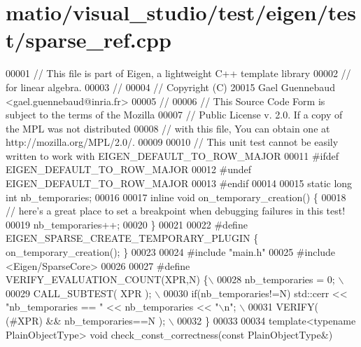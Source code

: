 \hypertarget{matio_2visual__studio_2test_2eigen_2test_2sparse__ref_8cpp_source}{}\section{matio/visual\+\_\+studio/test/eigen/test/sparse\+\_\+ref.cpp}
\label{matio_2visual__studio_2test_2eigen_2test_2sparse__ref_8cpp_source}

\begin{DoxyCode}
00001 \textcolor{comment}{// This file is part of Eigen, a lightweight C++ template library}
00002 \textcolor{comment}{// for linear algebra.}
00003 \textcolor{comment}{//}
00004 \textcolor{comment}{// Copyright (C) 20015 Gael Guennebaud <gael.guennebaud@inria.fr>}
00005 \textcolor{comment}{//}
00006 \textcolor{comment}{// This Source Code Form is subject to the terms of the Mozilla}
00007 \textcolor{comment}{// Public License v. 2.0. If a copy of the MPL was not distributed}
00008 \textcolor{comment}{// with this file, You can obtain one at http://mozilla.org/MPL/2.0/.}
00009 
00010 \textcolor{comment}{// This unit test cannot be easily written to work with EIGEN\_DEFAULT\_TO\_ROW\_MAJOR}
00011 \textcolor{preprocessor}{#ifdef EIGEN\_DEFAULT\_TO\_ROW\_MAJOR}
00012 \textcolor{preprocessor}{#undef EIGEN\_DEFAULT\_TO\_ROW\_MAJOR}
00013 \textcolor{preprocessor}{#endif}
00014 
00015 \textcolor{keyword}{static} \textcolor{keywordtype}{long} \textcolor{keywordtype}{int} nb\_temporaries;
00016 
00017 \textcolor{keyword}{inline} \textcolor{keywordtype}{void} on\_temporary\_creation() \{
00018   \textcolor{comment}{// here's a great place to set a breakpoint when debugging failures in this test!}
00019   nb\_temporaries++;
00020 \}
00021 
00022 \textcolor{preprocessor}{#define EIGEN\_SPARSE\_CREATE\_TEMPORARY\_PLUGIN \{ on\_temporary\_creation(); \}}
00023 
00024 \textcolor{preprocessor}{#include "main.h"}
00025 \textcolor{preprocessor}{#include <Eigen/SparseCore>}
00026 
00027 \textcolor{preprocessor}{#define VERIFY\_EVALUATION\_COUNT(XPR,N) \{\(\backslash\)}
00028 \textcolor{preprocessor}{    nb\_temporaries = 0; \(\backslash\)}
00029 \textcolor{preprocessor}{    CALL\_SUBTEST( XPR ); \(\backslash\)}
00030 \textcolor{preprocessor}{    if(nb\_temporaries!=N) std::cerr << "nb\_temporaries == " << nb\_temporaries << "\(\backslash\)n"; \(\backslash\)}
00031 \textcolor{preprocessor}{    VERIFY( (#XPR) && nb\_temporaries==N ); \(\backslash\)}
00032 \textcolor{preprocessor}{  \}}
00033 
00034 \textcolor{keyword}{template}<\textcolor{keyword}{typename} PlainObjectType> \textcolor{keywordtype}{void} check\_const\_correctness(\textcolor{keyword}{const} PlainObjectType&)

\end{DoxyCode}
